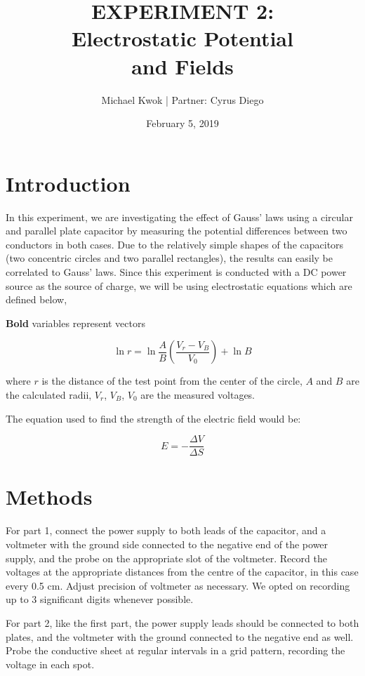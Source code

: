 \documentclass[12pt]{article}
\title{EXPERIMENT 2: \protect\\ Electrostatic Potential \protect\\ and Fields}
\date{February 5, 2019}
\author{Michael Kwok | Partner: Cyrus Diego }
\begin{document}
\maketitle
\pagebreak

\section{Introduction}

In this experiment, we are investigating the effect of Gauss’ laws using a circular and parallel plate capacitor by measuring the potential differences between two conductors in both cases. Due to the relatively simple shapes of the capacitors (two concentric circles and two parallel rectangles), the results can easily be correlated to Gauss’ laws. Since this experiment is conducted with a DC power source as the source of charge, we will be using electrostatic equations which are defined below,

\textbf{Bold} variables represent vectors

\begin{equation} \label{eq:ln_eq}
    \ln r = \ln \frac{A}{B}(\frac{V_r-V_B}{V_0})+\ln B
\end{equation}

where $r$  is the distance of the test point from the center of the circle, $A$
and $B$ are the calculated radii, $V_r$, $V_B$, $V_0$ are the measured voltages.

The equation used to find the strength of the electric field would be:

\begin{equation} \label{eq:ef_strength}
    E=-\frac{\Delta V}{\Delta S}
\end{equation}

\section{Methods}

For part 1, connect the power supply to both leads of the capacitor, and a
voltmeter with the ground side connected to the negative end of the power
supply, and the probe on the appropriate slot of the voltmeter. Record the
voltages at the appropriate distances from the centre of the capacitor, in this
case every 0.5 cm. Adjust precision of voltmeter as necessary. We opted on
recording up to 3 significant digits whenever possible.

For part 2, like the first part, the power supply leads should be connected to
both plates, and the voltmeter with the ground connected to the negative end as
well. Probe the conductive sheet at regular intervals in a grid pattern,
recording the voltage in each spot.
\end{document}
